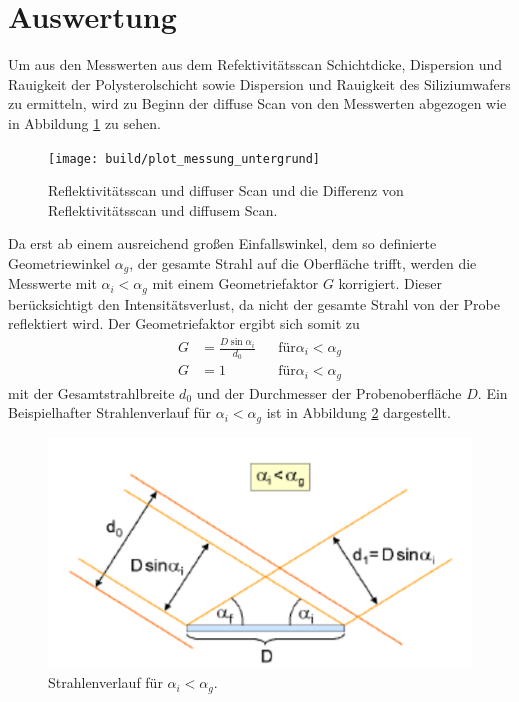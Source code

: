 \newpage
\section{Auswertung}
\label{sec:Auswertung}
Um aus den Messwerten aus dem Refektivitätsscan Schichtdicke, Dispersion
und Rauigkeit der Polysterolschicht sowie Dispersion und Rauigkeit des Siliziumwafers
zu ermitteln, wird
zu Beginn der diffuse Scan von den Messwerten abgezogen wie in Abbildung
\ref{fig:diffuse_Scan} zu sehen.

\begin{figure}
  \centering
  \texttt{[image: build/plot\_messung\_untergrund]}
  \caption{Reflektivitätsscan und diffuser Scan und die Differenz von Reflektivitätsscan und diffusem Scan.}
  \label{fig:diffuse_Scan}
\end{figure}

Da erst ab einem ausreichend großen Einfallswinkel,
dem so definierte Geometriewinkel $\alpha_g$,
der gesamte Strahl auf die Oberfläche trifft,
werden die Messwerte mit $\alpha_i < \alpha_g$
mit einem Geometriefaktor $G$ korrigiert.
Dieser berücksichtigt den Intensitätsverlust, da
nicht der gesamte Strahl von der Probe reflektiert wird.
Der Geometriefaktor ergibt sich somit zu
\begin{align}
G&=\frac{D\sin\alpha_i}{d_0} &  &\text{für} \alpha_i<\alpha_g \\
G&=1 & &\text{für} \alpha_i<\alpha_g
\end{align}
mit der Gesamtstrahlbreite $d_0$ und der Durchmesser der Probenoberfläche $D$.
Ein Beispielhafter Strahlenverlauf für $\alpha_i<\alpha_g$ ist in Abbildung \ref{fig:geo}
dargestellt.
\begin{figure}
  \centering
  \includegraphics{bilder/geo_winkel.PNG}
  \caption{Strahlenverlauf für $\alpha_i<\alpha_g$. \cite{sample}}
  \label{fig:geo}
\end{figure}

